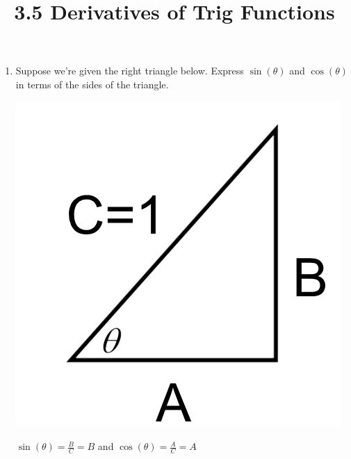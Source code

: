 \documentclass[nooutcomes,handout]{ximera}
\title{3.5 Derivatives of Trig Functions}
\begin{document}
\begin{abstract}		\end{abstract}
\maketitle


\begin{problem} \hfil
	\begin{enumerate}
	\item Suppose we're given the right triangle below.  Express $\sin(\theta)$ and $\cos(\theta)$ in terms of the sides of the triangle.

	\begin{image}
	\includegraphics[scale=.3]{figure1.png}
	\end{image}
	\begin{freeResponse}
	$\sin(\theta)=\frac{B}{C}=B$ and $\cos(\theta)=\frac{A}{C}=A$ 
	\end{freeResponse}


\end{enumerate}
\end{problem}
\end{document}
